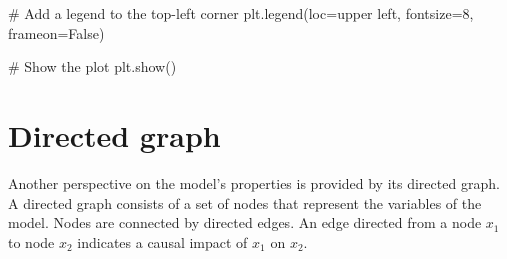 \documentclass[
  letterpaper,
  DIV=11,
  numbers=noendperiod]{scrreprt}
\newenvironment{Shaded}{\begin{snugshade}}{\end{snugshade}}
\newcommand{\CommentTok}[1]{\textcolor[rgb]{0.37,0.37,0.37}{#1}}
\newcommand{\DecValTok}[1]{\textcolor[rgb]{0.68,0.00,0.00}{#1}}
\newcommand{\NormalTok}[1]{\textcolor[rgb]{0.00,0.23,0.31}{#1}}
\newcommand{\OperatorTok}[1]{\textcolor[rgb]{0.37,0.37,0.37}{#1}}
\newcommand{\StringTok}[1]{\textcolor[rgb]{0.13,0.47,0.30}{#1}}
\newcommand{\VariableTok}[1]{\textcolor[rgb]{0.07,0.07,0.07}{#1}}
\begin{document}
\begin{tcolorbox}
\begin{Shaded}
\begin{Highlighting}[]
\CommentTok{\# Add a legend to the top{-}left corner}
\NormalTok{plt.legend(loc}\OperatorTok{=}\StringTok{\textquotesingle{}upper left\textquotesingle{}}\NormalTok{, fontsize}\OperatorTok{=}\DecValTok{8}\NormalTok{, frameon}\OperatorTok{=}\VariableTok{False}\NormalTok{)}

\CommentTok{\# Show the plot}
\NormalTok{plt.show()}
\end{Highlighting}
\end{Shaded}

\end{tcolorbox}

\section{Directed graph}\label{directed-graph-13}

Another perspective on the model's properties is provided by its
directed graph. A directed graph consists of a set of nodes that
represent the variables of the model. Nodes are connected by directed
edges. An edge directed from a node \(x_1\) to node \(x_2\) indicates a
causal impact of \(x_1\) on \(x_2\).
\end{document}

